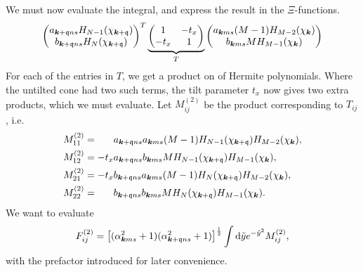We must now evaluate the integral, and express the result in the \( \Xi \)-functions.
\[
    \begin{pmatrix}
      a_{\bm{k} + \mathfrak{q} n s} H_{N-1} ( \chi _{\bm{k} + \mathfrak{q}} )\\
      b_{\bm{k} + \mathfrak{q} ns} H_N ( \chi _{\bm{k} + \mathfrak{q}} )
    \end{pmatrix}^{T}
  \underbrace{
    \begin{pmatrix}
      1 & -t_x\\
      -t_x & 1
    \end{pmatrix}
    }_{T}
    \begin{pmatrix}
      a_{\bm{k} m s} (M-1) H_{M-2} (\chi_{\bm{k}})\\
      b_{\bm{k} m s} M H_{M-1} ( \chi _{\bm{k}} )
    \end{pmatrix}
\]
For each of the entries in \( T \), we get a product on of Hermite polynomials.
Where the untilted cone had two such terms, the tilt parameter \( t _x \) now gives two extra products, which we must evaluate.
Let \( M^{(2)}_{ij} \) be the product corresponding to \( T_{ij} \), i.e.
\begin{align}
  M^{(2)}_{11} &= \phantom{-t_x} a_{\bm{k} + \mathfrak{q} ns} a_{\bm{k} ms} (M-1) H_{N-1} (\chi_{\bm{k} + \mathfrak{q}}) H_{M-2} (\chi_{\bm{k}}),\\
  M^{(2)}_{12} &= -t_x a_{\bm{k} + \mathfrak{q} ns} b_{\bm{k} ms} M H_{N-1} (\chi_{\bm{k} + \mathfrak{q}}) H_{M-1} (\chi_{\bm{k}}),\\
  M^{(2)}_{21} &= -t_x b_{\bm{k} + \mathfrak{q} ns} a_{\bm{k} ms} ( M-1 ) H_{N} (\chi_{\bm{k} + \mathfrak{q}}) H_{M-2} (\chi_{\bm{k}}),\\
  M^{(2)}_{22} &= \phantom{-t_x} b_{\bm{k} + \mathfrak{q} ns} b_{\bm{k} ms} M H_N (\chi_{\bm{k} + \mathfrak{q}}) H_{M-1} (\chi_{\bm{k}}).
\end{align}
We want to evaluate
\begin{equation}
  \label{eq:54}
  F^{(2)}_{ij} =
  \left[(\alpha_{\bm{k} m s}^2 + 1) ( \alpha _{\bm{k} + \mathfrak{q} n s}^2 + 1 )\right]^{\frac{1}{2}}
  \int \mathrm{d} \tilde{y}
  e^{-\tilde{y}^2}
  M^{(2)}_{ij},
\end{equation}
with the prefactor introduced for later convenience.

